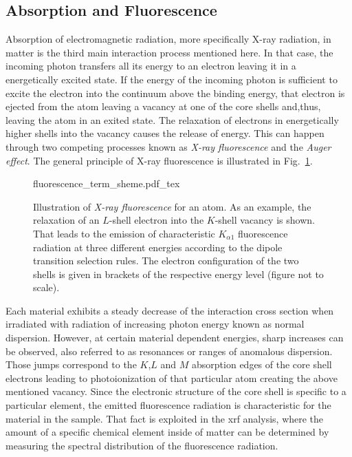 \subsection{Absorption and Fluorescence} \label{ch_theo:sec_absorption_and_fluorescence}
Absorption of electromagnetic radiation, more specifically X-ray radiation, in matter is the third main interaction process mentioned here. In that case, the incoming photon transfers all its energy to an electron leaving it in a energetically excited state. If the energy of the incoming photon is sufficient to excite the electron into the continuum above the binding energy, that electron is ejected from the atom leaving a vacancy at one of the core shells and,thus, leaving the atom in an exited state. The relaxation of electrons in energetically higher shells into the vacancy causes the release of energy. This can happen through two competing processes known as \emph{X-ray fluorescence} and the \emph{Auger effect}. The general principle of X-ray fluorescence is illustrated in Fig.~\ref{ch_theo:fig_fluorescence_term_sheme}.
\begin{figure}[htb]
    \def\svgwidth{0.5\textwidth}
    {fluorescence_term_sheme.pdf_tex}
    \caption[Illustration of \emph{X-ray fluorescence} for an atom.]{Illustration of \emph{X-ray fluorescence} for an atom. As an example, the relaxation of an $L$-shell electron into the $K$-shell vacancy is shown. That leads to the emission of characteristic $K_{\alpha 1}$ fluorescence radiation at three different energies according to the dipole transition selection rules. The electron configuration of the two shells is given in brackets of the respective energy level (figure not to scale).}
    \label{ch_theo:fig_fluorescence_term_sheme}
\end{figure}

Each material exhibits a steady decrease of the interaction cross section when irradiated with radiation of increasing photon energy known as normal dispersion. However, at certain material dependent energies, sharp increases can be observed, also referred to as resonances or ranges of anomalous dispersion. Those jumps correspond to the $K$,$L$ and $M$ absorption edges of the core shell electrons leading to photoionization of that particular atom creating the above mentioned vacancy. Since the electronic structure of the core shell is specific to a particular element, the emitted fluorescence radiation is characteristic for the material in the sample. That fact is exploited in the \gls{xrf} analysis, where the amount of a specific chemical element inside of matter can be determined by measuring the spectral distribution of the fluorescence radiation.

